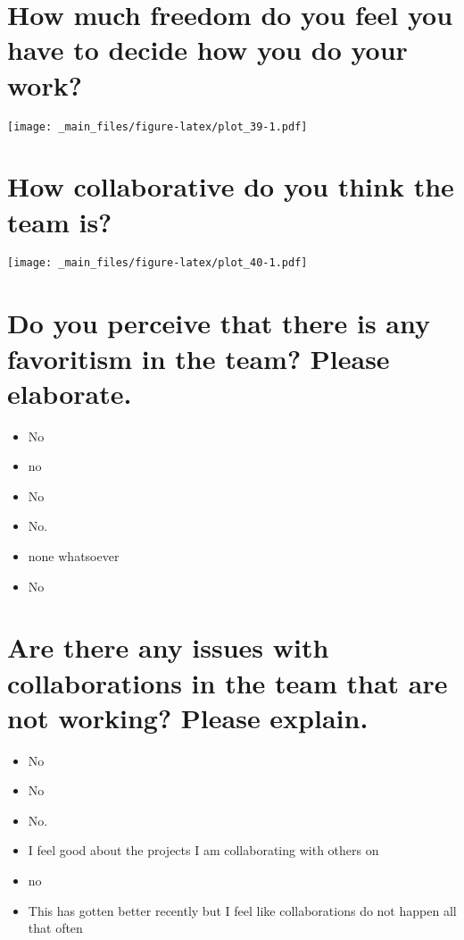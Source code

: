 \documentclass[
]{book}
\providecommand{\tightlist}{%
  \setlength{\itemsep}{0pt}\setlength{\parskip}{0pt}}
\begin{document}
\hypertarget{how-much-freedom-do-you-feel-you-have-to-decide-how-you-do-your-work}{%
\section{How much freedom do you feel you have to decide how you do your work?}\label{how-much-freedom-do-you-feel-you-have-to-decide-how-you-do-your-work}}

\texttt{[image: \_main\_files/figure-latex/plot\_39-1.pdf]}

\hypertarget{how-collaborative-do-you-think-the-team-is}{%
\section{How collaborative do you think the team is?}\label{how-collaborative-do-you-think-the-team-is}}

\texttt{[image: \_main\_files/figure-latex/plot\_40-1.pdf]}

\hypertarget{do-you-perceive-that-there-is-any-favoritism-in-the-team-please-elaborate.}{%
\section{Do you perceive that there is any favoritism in the team? Please elaborate.}\label{do-you-perceive-that-there-is-any-favoritism-in-the-team-please-elaborate.}}

\begin{itemize}
\tightlist
\item
  No
\item
  no
\item
  No
\item
  No.
\item
  none whatsoever
\item
  No
\end{itemize}

\hypertarget{are-there-any-issues-with-collaborations-in-the-team-that-are-not-working-please-explain.}{%
\section{Are there any issues with collaborations in the team that are not working? Please explain.}\label{are-there-any-issues-with-collaborations-in-the-team-that-are-not-working-please-explain.}}

\begin{itemize}
\tightlist
\item
  No
\item
  No
\item
  No.
\item
  I feel good about the projects I am collaborating with others on
\item
  no
\item
  This has gotten better recently but I feel like collaborations do not happen all that often
\end{itemize}
\end{document}
